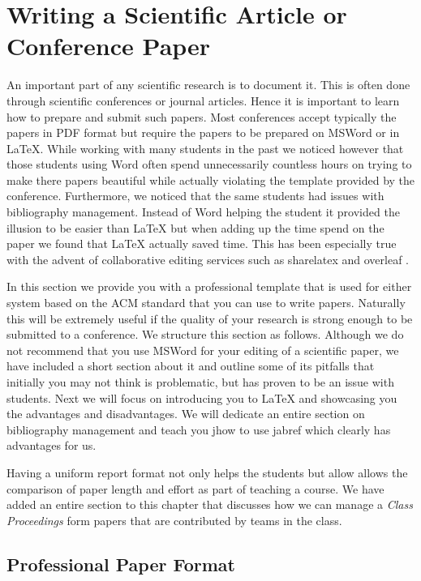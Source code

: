\FILENAME

\section{Writing a Scientific Article or Conference Paper}

An important part of any scientific research is to document it. This is
often done through scientific conferences or journal articles. Hence it
is important to learn how to prepare and submit such papers. Most
conferences accept typically the papers in PDF format but require the
papers to be prepared on MSWord or in LaTeX. While working with many
students in the past we noticed however that those students using Word
often spend unnecessarily countless hours on trying to make there papers
beautiful while actually violating the template provided by the
conference. Furthermore, we noticed that the same students had issues
with bibliography management. Instead of Word helping the student it
provided the illusion to be easier than LaTeX but when adding up the
time spend on the paper we found that LaTeX actually saved time. This
has been especially true with the advent of collaborative editing
services such as sharelatex \cite{www-sharelatex} and overleaf
\cite{www-overleaf}. 

In this section we provide you with a professional template that is used
for either system based on the ACM standard that you can use to write
papers. Naturally this will be extremely useful if the quality of your
research is strong enough to be submitted to a conference. We structure
this section as follows. Although we do not recommend that you use
MSWord for your editing of a scientific paper, we have included a short
section about it and outline some of its pitfalls that initially you may
not think is problematic, but has proven to be an issue with students.
Next we will focus on introducing you to LaTeX and showcasing you the
advantages and disadvantages. We will dedicate an entire section on
bibliography management and teach you jhow to use jabref which clearly
has advantages for us.

Having a uniform report format not only helps the students but allow
allows the comparison of paper length and effort as part of teaching a
course. We have added an entire section to this chapter that discusses
how we can manage a \emph{Class Proceedings} form papers that are
contributed by teams in the class.

\subsection{Professional Paper Format}\label{professional-paper-format}

